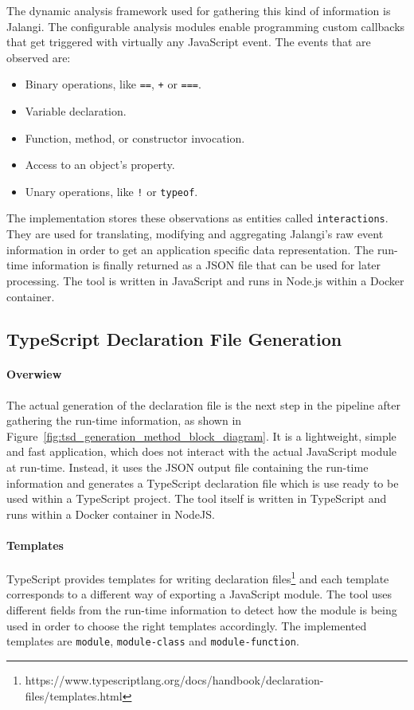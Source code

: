 \documentclass[a4paper,english,cleveref, autoref]{lipics-v2019}
\newcommand{\figref}[1]{Figure~\ref{#1}}
\begin{document}
The dynamic analysis framework used for gathering this kind of information is Jalangi. The configurable analysis modules enable programming custom callbacks that get triggered with virtually any JavaScript event. The events that are observed are:
\begin{itemize}
  \item Binary operations, like \lstinline{==}, \lstinline{+} or \lstinline{===}.
  \item Variable declaration.
  \item Function, method, or constructor invocation.
  \item Access to an object's property.
  \item Unary operations, like \lstinline{!} or \lstinline{typeof}.
\end{itemize}

The implementation stores these observations as entities called \lstinline{interactions}. They are used for translating, modifying and aggregating Jalangi's raw event information in order to get an application specific data representation. The run-time information is finally returned as a JSON file that can be used for later processing. The tool is written in JavaScript and runs in Node.js within a Docker container.

\subsection{TypeScript Declaration File Generation}
\paragraph*{Overwiew}
The actual generation of the declaration file is the next step in the pipeline after gathering the run-time information, as shown in \figref{fig:tsd_generation_method_block_diagram}. It is a lightweight, simple and fast application, which does not interact with the actual JavaScript module at run-time. Instead, it uses the JSON output file containing the run-time information and generates a TypeScript declaration file which is use ready to be used within a TypeScript project. The tool itself is written in TypeScript and runs within a Docker container in NodeJS. 

\paragraph*{Templates}
TypeScript provides templates for writing declaration files\footnote{https://www.typescriptlang.org/docs/handbook/declaration-files/templates.html} and each template corresponds to a different way of exporting a JavaScript module. The tool uses different fields from the run-time information to detect how the module is being used in order to choose the right templates accordingly. The implemented templates are \lstinline{module}, \lstinline{module-class} and \lstinline{module-function}.
\end{document}

